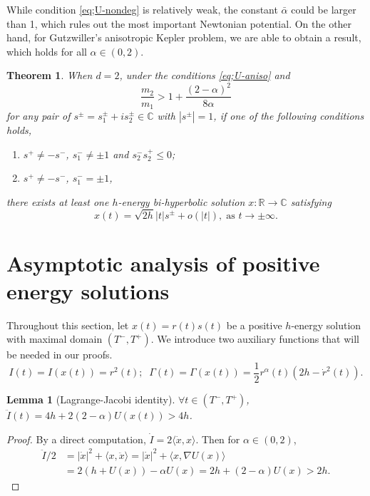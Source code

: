 \documentclass[11pt]{amsart}
\newcommand{\rr}{\mathbb R}
\newcommand{\cc}{\mathbb C}
\newcommand{\al}{\alpha}
\theoremstyle{plain}
\newtheorem{thm}{Theorem}[section]
\newtheorem{lem}{Lemma}[section]
\theoremstyle{definition}
\theoremstyle{remark}
\begin{document}
While condition \eqref{eq;U-nondeg} is relatively weak, the constant $\bar{\al}$ could be larger than 1, which rules out the most important Newtonian potential. On the other hand, for Gutzwiller's anisotropic Kepler problem, we are able to obtain a result, which holds for all $\al \in (0, 2)$.   

\begin{thm}
\label{thm;bi-hyperbolic-aniso} When $d=2$, under the conditions \eqref{eq;U-aniso} and  
\begin{equation} \label{U;spiral}  \frac{m_2}{m_1} > 1 + \frac{(2-\al)^2}{8\al}
\tag{U4} 
\end{equation} 
for any pair of $s^{\pm} = s^{\pm}_1+ is^{\pm}_2 \in \cc$ with $|s^{\pm}|=1$, if one of the following conditions holds, 
\begin{enumerate}
	\item[(i).] $s^+ \ne -s^-$, $s^-_1 \ne \pm 1$ and $s^-_2 s^+_2 \le 0$;
	\item[(ii).] $s^+ \ne -s^-$, $s^-_1 = \pm 1$, 
\end{enumerate}
there exists at least one $h$-energy bi-hyperbolic solution $x: \rr \to \cc$ satisfying
$$x(t) = \sqrt{2h} |t| s^{\pm} + o(|t|), \; \text{as } t \to \pm \infty.$$


\end{thm}
  

\section{Asymptotic analysis of positive energy solutions}

Throughout this section, let $x(t)= r(t)s(t)$ be a positive $h$-energy solution with maximal domain $(T^-, T^+)$. We introduce two auxiliary functions that will be needed in our proofs.  
\begin{equation}
\label{eq;I-Gamma} I(t) = I(x(t)) = r^2(t); \; \; \Gamma(t) = \Gamma (x(t)) = \frac{1}{2}r^{\al}(t)(2h - \dot{r}^2(t)). 
\end{equation} 
\begin{lem}[Lagrange-Jacobi identity]
\label{lem;Lag-Jacobi} $ \forall t \in (T^-, T^+)$, $\ddot{I}(t) = 4h + 2(2-\al)U(x(t)) >4h$.
\end{lem}

\begin{proof}
By a direct computation, $\dot{I} = 2 \langle \dot{x}, x \rangle$. Then for $\al \in (0, 2)$,
$$
\begin{aligned}
 \ddot{I}/2 & = |\dot{x}|^2 + \langle x, \ddot{x} \rangle = |\dot{x}|^2 + \langle x, \nabla U(x) \rangle \\
 			  & = 2 ( h + U(x)) - \al U(x) = 2h + (2-\al) U(x) >2h.
 \end{aligned} 
$$
\end{proof}
\end{document}
